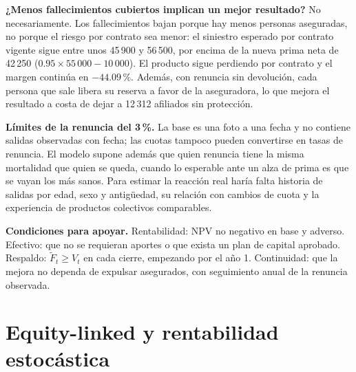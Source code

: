\documentclass[10pt,a4paper]{article}
\numberwithin{equation}{section}
\begin{document}
	\textbf{¿Menos fallecimientos cubiertos implican un mejor resultado?} No necesariamente. Los fallecimientos bajan porque hay menos personas aseguradas, no porque el riesgo por contrato sea menor: el siniestro esperado por contrato vigente sigue entre unos 45\,900 y 56\,500, por encima de la nueva prima neta de 42\,250 (\(0.95\times55\,000-10\,000\)). El producto sigue perdiendo por contrato y el margen continúa en \(-44.09\,\%\). Además, con renuncia sin devolución, cada persona que sale libera su reserva a favor de la aseguradora, lo que mejora el resultado a costa de dejar a 12\,312 afiliados sin protección.

	\textbf{Límites de la renuncia del 3\,\%.} La base es una foto a una fecha y no contiene salidas observadas con fecha; las cuotas tampoco pueden convertirse en tasas de renuncia. El modelo supone además que quien renuncia tiene la misma mortalidad que quien se queda, cuando lo esperable ante un alza de prima es que se vayan los más sanos. Para estimar la reacción real haría falta historia de salidas por edad, sexo y antigüedad, su relación con cambios de cuota y la experiencia de productos colectivos comparables.

	\textbf{Condiciones para apoyar.} Rentabilidad: NPV no negativo en base y adverso. Efectivo: que no se requieran aportes o que exista un plan de capital aprobado. Respaldo: \(\widetilde F_t\ge V_t\) en cada cierre, empezando por el año 1. Continuidad: que la mejora no dependa de expulsar asegurados, con seguimiento anual de la renuncia observada.

	\section{Equity-linked y rentabilidad estocástica}\label{sec:E}
\end{document}
